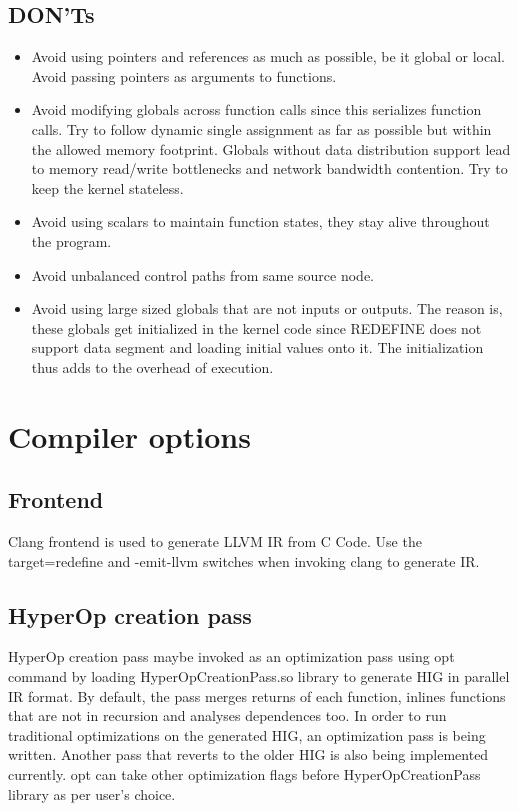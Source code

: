 \documentclass[12pt]{article}
\begin{document}
\subsection{DON'Ts}
\begin{itemize}
 \item Avoid using pointers and references as much as possible, be it global or local. Avoid passing pointers as arguments to functions.
 \item Avoid modifying globals across function calls since this serializes function calls. Try to follow dynamic single assignment as far as possible but within the allowed memory footprint. Globals without data distribution support lead to memory read/write bottlenecks and network bandwidth contention. Try to keep the kernel stateless.
 \item Avoid using scalars to maintain function states, they stay alive throughout the program.
 \item Avoid unbalanced control paths from same source node.
 \item Avoid using large sized globals that are not inputs or outputs. The reason is, these globals get initialized in the kernel code since REDEFINE does not support data segment and loading initial values onto it. The initialization thus adds to the overhead of execution.
\end{itemize}

\section{Compiler options}
\subsection{Frontend}
Clang frontend is used to generate LLVM IR from C Code. Use the target=redefine and -emit-llvm switches when invoking clang to generate IR. 
\subsection{HyperOp creation pass}
HyperOp creation pass maybe invoked as an optimization pass using opt command by loading HyperOpCreationPass.so library to generate HIG in parallel IR format. By default, the pass merges returns of each function, inlines functions that are not in recursion and analyses dependences too. In order to run traditional optimizations on the generated HIG, an optimization pass is being written. Another pass that reverts to the older HIG is also being implemented currently. opt can take other optimization flags before HyperOpCreationPass library as per user's choice.
\end{document}
